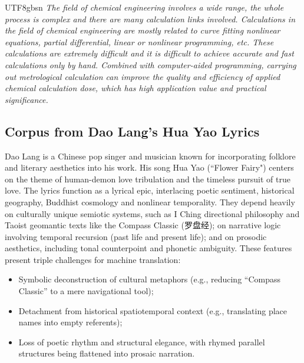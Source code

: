 \documentclass[conference]{IEEEtran}
\begin{document}
\begin{CJK}{UTF8}{gbsn}
\textit{The field of chemical engineering involves a wide range, the whole process is complex and there are many calculation links involved. Calculations in the field of chemical engineering are mostly related to curve fitting nonlinear equations, partial differential, linear or nonlinear programming, etc. These calculations are extremely difficult and it is difficult to achieve accurate and fast calculations only by hand. Combined with computer-aided programming, carrying out metrological calculation can improve the quality and efficiency of applied chemical calculation dose, which has high application value and practical significance.}

\subsection{Corpus from Dao Lang’s Hua Yao Lyrics}
Dao Lang is a Chinese pop singer and musician known for incorporating folklore and literary aesthetics into his work. His song Hua Yao (``Flower Fairy") centers on the theme of human-demon love tribulation and the timeless pursuit of true love. %
The lyrics function as a lyrical epic, interlacing poetic sentiment, historical geography, Buddhist cosmology and nonlinear temporality. They depend heavily on culturally unique semiotic systems, such as I Ching directional philosophy and Taoist geomantic texts like the Compass Classic (罗盘经); on narrative logic involving temporal recursion (past life and present life); and on prosodic aesthetics, including tonal counterpoint and phonetic ambiguity. These features present triple challenges for machine translation:
\begin{itemize}
\item	Symbolic deconstruction of cultural metaphors (e.g., reducing ``Compass Classic'' to a mere navigational tool);
\item Detachment from historical spatiotemporal context (e.g., translating place names into empty referents);
\item Loss of poetic rhythm and structural elegance, with rhymed parallel structures being flattened into prosaic narration. 
\end{itemize}


\end{CJK}
\end{document}
